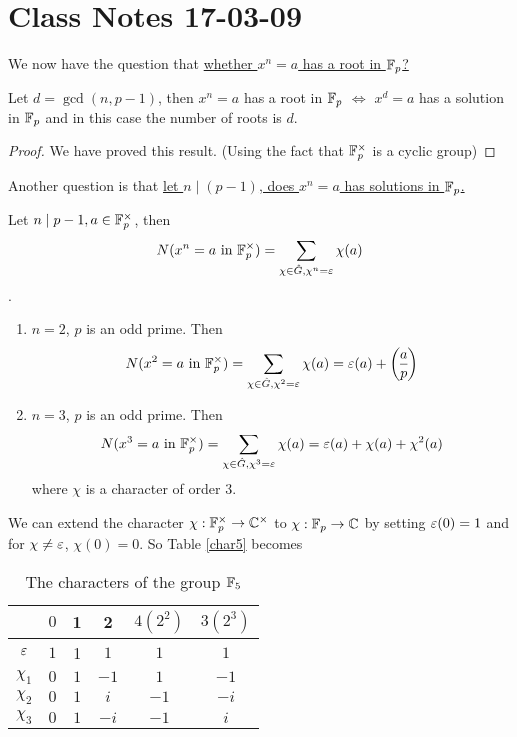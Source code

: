\section{Class Notes 17-03-09}
We now have the question that \underline{whether $x^n=a$ has a root in $\mathbb{F}_p$?}\\
\begin{proposition}
Let $d = \gcd(n, p-1)$, then $x^n=a$ has a root in $\mathbb{F}_p$ $\Leftrightarrow$ $x^d=a$ has a solution in $\mathbb{F}_p$ and in this case the number of roots is $d$.
\end{proposition}
\begin{proof}
We have proved this result. (Using the fact that $\mathbb{F}_p^\times$ is a cyclic group)
\end{proof}
Another question is that \underline{let $n\mid(p-1)$, does $x^n = a$ has solutions in $\mathbb{F}_p$.}
\begin{theorem}
Let $n\mid p-1, a\in \mathbb{F}_p^\times$, then $$N(x^n=a\mbox{ in }\mathbb{F}_p^\times)=\sum_{\chi\in\hat{G},\chi^n=\varepsilon}\chi(a)$$.\end{theorem}
\begin{example}\mbox{}
\begin{enumerate}
	\item $n=2$, $p$ is an odd prime. Then
	$$N(x^2=a\mbox{ in }\F_p^\times)=\sum_{\chi\in\hat{G},\chi^2=\e}\chi(a)=\e(a)+\leg{a}{p}$$
	\item $n=3$, $p$ is an odd prime. Then
	$$N(x^3=a\mbox{ in }\mathbb{F}_p^\times)=\sum_{\chi\in\hat{G},\chi^3=\varepsilon}\chi(a)=\varepsilon(a)+\chi(a)+\chi^2(a)$$where $\chi$ is a character of order $3$.
\end{enumerate}
\end{example}
We can extend the character $\chi:\mathbb{F}_p^\times\rightarrow\mathbb{C}^\times$ to $\chi:\mathbb{F}_p\rightarrow\mathbb{C}$ by setting $\varepsilon(0)=1$ and for $\chi\ne\varepsilon$, $\chi(0)=0$. So Table \ref{char5} becomes
\begin{table}[htbp]
\centering
\begin{tabular}{c|ccccc}
  & $0$ & 1 & 2 & $4(2^2)$ & $3(2^3)$ \\\hline
  $\varepsilon$ & $1$ & 1 & $1$ & $1$ & $1$ \\
  $\chi_1 $& $0$ & $1$ & $-1$ & $1$ & $-1$\\
  $\chi_2$ & $0$  & $1$ & $i$ & $-1$ & $-i$\\
  $\chi_3$ & $0$  & $1$ & $-i$ & $-1$ & $i$\\
\end{tabular}
\caption{The characters of the group $\mathbb{F}_5$\label{char5new}}
\end{table}
